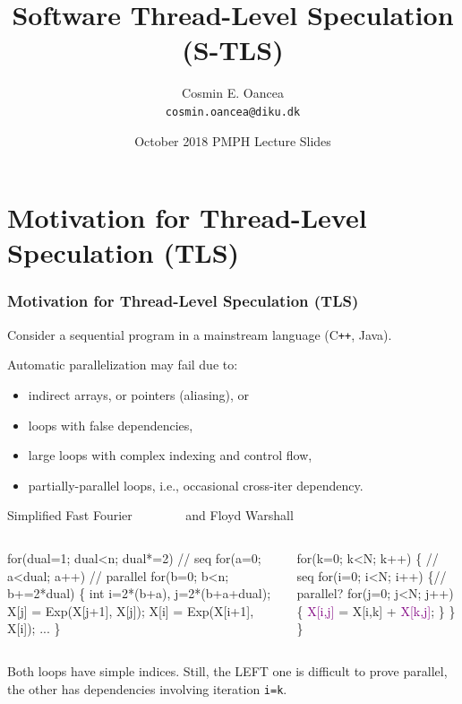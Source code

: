 \documentclass{beamer}
\title[S-TLS]{Software Thread-Level Speculation (S-TLS)}
\author[C.~Oancea]{Cosmin E. Oancea\\{\tt cosmin.oancea@diku.dk}}
\institute{Department of Computer Science (DIKU)\\University of Copenhagen}
\date[Oct'18]{October 2018 PMPH Lecture Slides}
\newcommand{\blue}[1]{\textcolor{Blue}{{#1}}}
\newcommand{\purple}[1]{\textcolor{Purple}{{#1}}}
\newcommand{\emp}[1]{\textcolor{DikuRed}{ #1}}
\newcommand{\emphh}[1]{\textcolor{CosGreen}{ #1}}
\newcommand{\mymath}[1]{$ #1 $}
\begin{document}
\titleslide




\begin{frame}[fragile]
	\tableofcontents
\end{frame}

\section{Motivation for Thread-Level Speculation (TLS)}

\begin{frame}[fragile,t]
  \frametitle{Motivation for Thread-Level Speculation (TLS)}

Consider a sequential program in a mainstream language (C{\tt ++}, Java).

\emp{Automatic parallelization may fail due to:}
\begin{itemize}
    \item indirect arrays, or pointers (aliasing), or
    \item loops with false dependencies,
    \item large loops with complex indexing and control flow,
    \item partially-parallel loops, 
            i.e., occasional cross-iter dependency.
\end  {itemize}\medskip

\begin{block}{Simplified Fast Fourier {\tt~~~~~~~} and Floyd Warshall}
\begin{columns}
\begin{colorcode}
for(dual=1; dual<n; dual*=2) // \emp{seq}
  for(a=0; a<dual; a++) // \emphh{parallel}
    for(b=0; b<n; b+=2*dual)      \{ 
      int i=2*(b+a), j=2*(b+a+dual); 
      X[j] = Exp(X[j+1], X[j]);  
      X[i] = Exp(X[i+1], X[i]); ... 
    \} 
\end{colorcode}
\begin{colorcode}
for(k=0; k<N; k++) \{  // \emp{seq}
  for(i=0; i<N; i++) \{// \emphh{parallel?}
    for(j=0; j<N; j++) \{
      \purple{X[i,j]} = X[i,k] + \purple{X[k,j]};
    \}
  \}
\}
\end{colorcode}
\end{columns}
\end{block} 

\emp{Both loops have simple indices. Still, the LEFT one
is difficult to prove parallel, the other has 
dependencies involving iteration {\tt i=k}.}

\end{frame}
\end{document}
